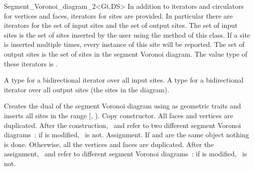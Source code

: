 \begin{ccRefClass}{Segment_Voronoi_diagram_2<Gt,DS>}
In addition to iterators and circulators for vertices and faces,
iterators for sites are provided. In particular there are iterators
for the set of input sites and the set of output sites. The set of
input sites is the set of sites inserted by the user using the
 method of this class. If a site is inserted multiple
times, every instance of this site will be reported. The set of output
sites is the set of sites in the segment Voronoi diagram. The value
type of these iterators is .

{}
{A type for a bidirectional iterator over all input sites.}
\ccGlue
{}
{A type for a bidirectional iterator over all output sites (the sites
  in the diagram).}


\ccCreation
{}
\ccThreeToTwo
%
%
{Creates the dual of the segment Voronoi diagram using  as
geometric traits and inserts all sites in the range
[, ).
}
%
{Copy constructor. All faces and vertices are duplicated. After the
  construction, 
  \ccVar\ and  refer to two different segment Voronoi diagrams~: if
   is modified, \ccVar\ is not.}
%
{Assignment. If  and  are the same object
  nothing is done. Otherwise, all the vertices and faces are
  duplicated. After the assignment, \ccVar\ and  refer to
  different segment Voronoi diagrams~: if  is modified,
  \ccVar\ is not.}





\end{ccRefClass}
